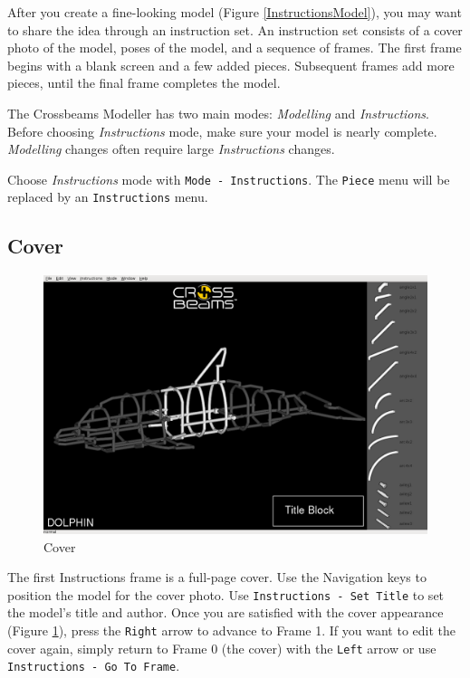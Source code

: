 \documentclass[12pt]{report}
\begin{document}
After you create a fine-looking model (Figure
\ref{InstructionsModel}), you may want to share the idea through an
instruction set.  An instruction set consists of a cover photo of the
model, poses of the model, and a sequence of frames.  The first frame
begins with a blank screen and a few added pieces.  Subsequent frames
add more pieces, until the final frame completes the model.

The Crossbeams Modeller has two main modes: \emph{Modelling} and
\emph{Instructions}.  Before choosing \emph{Instructions} mode,
make sure your model is nearly complete.  \emph{Modelling} changes
often require large \emph{Instructions} changes.

Choose \emph{Instructions} mode with {\tt Mode - Instructions}.  The
{\tt Piece} menu will be replaced by an {\tt Instructions} menu.

\subsection{Cover}

\begin{figure}[h]
\begin{center}
\includegraphics[width=6.38in]{doc_images/manual_instructions_cover.png}
\caption{Cover}
\label{InstructionsCover}
\end{center}
\end{figure}

The first Instructions frame is a full-page cover.  Use the Navigation
keys to position the model for the cover photo.  Use {\tt Instructions
  - Set Title} to set the model's title and author.  Once you are
satisfied with the cover appearance (Figure \ref{InstructionsCover}),
press the {\tt Right} arrow to advance to Frame 1.  If you want to
edit the cover again, simply return to Frame 0 (the cover) with the
{\tt Left} arrow or use {\tt Instructions - Go To Frame}.
\end{document}
